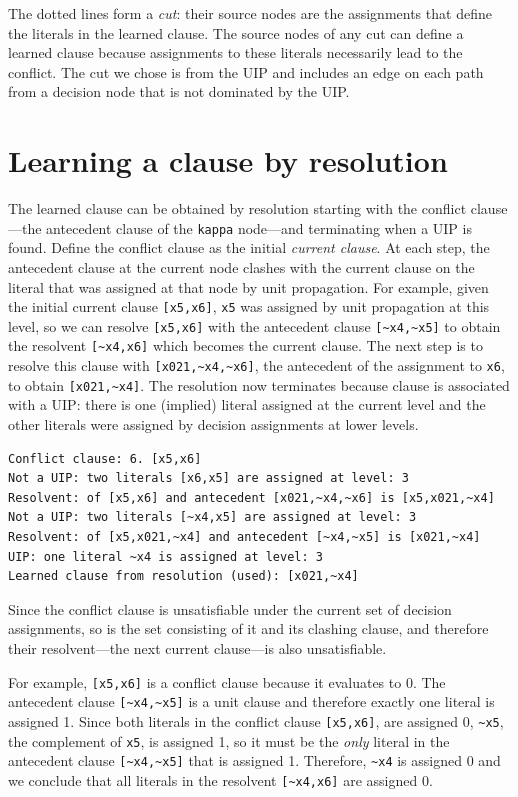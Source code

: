 \documentclass[11pt]{report}
\newcommand*{\p}[1]{\textup{\texttt{#1}}}
\begin{document}
The dotted lines form a \emph{cut}: their source nodes are the
assignments that define the literals in the learned clause. The source
nodes of any cut can define a learned clause because assignments to
these literals necessarily lead to the conflict. The cut we chose is
from the UIP and includes an edge on each path from a decision node that
is not dominated by the UIP.

\newpage

\section{Learning a clause by resolution}\label{learned.res}

The learned clause can be obtained by resolution starting with the
conflict clause---the antecedent clause of the \p{kappa} node---and
terminating when a UIP is found. Define the conflict clause as the
initial \emph{current clause}. At each step, the antecedent clause at
the current node clashes with the current clause on the literal that was
assigned at that node by unit propagation. For example, given the
initial current clause \verb+[x5,x6]+, \p{x5} was assigned by unit
propagation at this level, so we can resolve \verb+[x5,x6]+ with the
antecedent clause \verb+[~x4,~x5]+ to obtain the resolvent
\verb+[~x4,x6]+ which becomes the current clause. The next step is to
resolve this clause with \verb+[x021,~x4,~x6]+, the antecedent of the
assignment to \p{x6}, to obtain \verb+[x021,~x4]+. The resolution now
terminates because clause is associated with a UIP: there is one
(implied) literal assigned at the current level and the other literals
were assigned by decision assignments at lower levels.

\begin{verbatim}
Conflict clause: 6. [x5,x6]
Not a UIP: two literals [x6,x5] are assigned at level: 3
Resolvent: of [x5,x6] and antecedent [x021,~x4,~x6] is [x5,x021,~x4]
Not a UIP: two literals [~x4,x5] are assigned at level: 3
Resolvent: of [x5,x021,~x4] and antecedent [~x4,~x5] is [x021,~x4]
UIP: one literal ~x4 is assigned at level: 3
Learned clause from resolution (used): [x021,~x4]
\end{verbatim}

Since the conflict clause is unsatisfiable under the current set of
decision assignments, so is the set consisting of it and its clashing
clause, and therefore their resolvent---the next current clause---is
also unsatisfiable.

For example, \verb+[x5,x6]+ is a conflict clause because it evaluates to
0. The antecedent clause \verb+[~x4,~x5]+ is a unit clause and therefore
exactly one literal is assigned 1. Since both literals in the conflict
clause \verb+[x5,x6]+, are assigned 0, \verb+~x5+, the complement of
\verb+x5+, is assigned 1, so it must be the \emph{only} literal in the
antecedent clause \verb+[~x4,~x5]+ that is assigned 1. Therefore,
\verb+~x4+ is assigned 0 and we conclude that all literals in the
resolvent \verb+[~x4,x6]+ are assigned 0.
\end{document}
